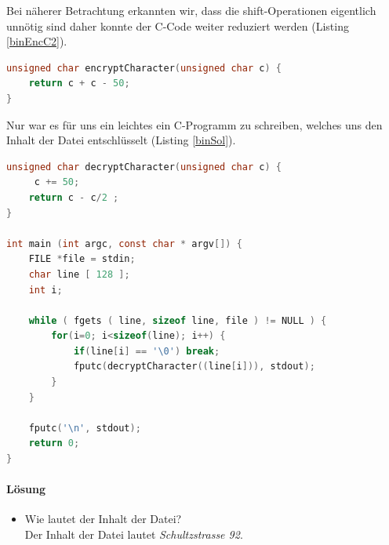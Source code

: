 \documentclass[12pt]{article}
\begin{document}
Bei näherer Betrachtung erkannten wir, dass die shift-Operationen eigentlich unnötig sind daher konnte der C-Code weiter reduziert werden (Listing \ref{binEncC2}).
\begin{lstlisting}[language=C, caption={C-Code der Methode encryptCharacter},label=binEncC2,basicstyle=\footnotesize]
unsigned char encryptCharacter(unsigned char c) {
    return c + c - 50;
}
\end{lstlisting}
Nur war es für uns ein leichtes ein C-Programm zu schreiben, welches uns den Inhalt der Datei entschlüsselt (Listing \ref{binSol}).
\begin{lstlisting}[language=C, caption={Entschlüsselungsprogramm in C},label=binSol,basicstyle=\footnotesize]
unsigned char decryptCharacter(unsigned char c) { 
     c += 50; 
    return c - c/2 ; 
}

int main (int argc, const char * argv[]) {
    FILE *file = stdin;
    char line [ 128 ];  
    int i;
    
    while ( fgets ( line, sizeof line, file ) != NULL ) {
        for(i=0; i<sizeof(line); i++) {
            if(line[i] == '\0') break;
            fputc(decryptCharacter((line[i])), stdout);
        }
    }
  
    fputc('\n', stdout);
    return 0;
}
\end{lstlisting}


\paragraph{Lösung}
\begin{itemize}
	\item Wie lautet der Inhalt der Datei?\\
		Der Inhalt der Datei lautet \textit{Schultzstrasse 92}.
\end{itemize}
\end{document}
